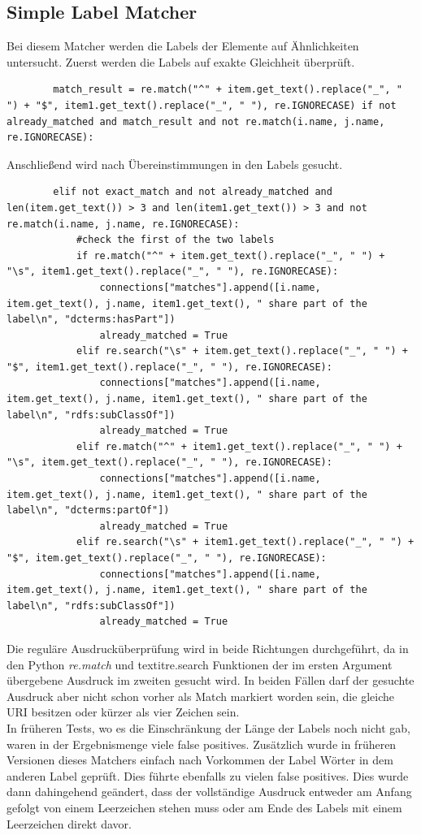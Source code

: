 		\subsection{Simple Label Matcher}
		\label{simpleOntologyMatcher}
		Bei diesem Matcher werden die Labels der Elemente auf Ähnlichkeiten
		untersucht.
		Zuerst werden die Labels auf exakte Gleichheit überprüft.
		\begin{lstlisting}
		match_result = re.match("^" + item.get_text().replace("_", " ") + "$", item1.get_text().replace("_", " "), re.IGNORECASE) if not already_matched and match_result and not re.match(i.name, j.name, re.IGNORECASE):
		\end{lstlisting}
		Anschließend wird nach Übereinstimmungen in den Labels gesucht.
		\begin{lstlisting}
		elif not exact_match and not already_matched and len(item.get_text()) > 3 and len(item1.get_text()) > 3 and not re.match(i.name, j.name, re.IGNORECASE):
            #check the first of the two labels
            if re.match("^" + item.get_text().replace("_", " ") + "\s", item1.get_text().replace("_", " "), re.IGNORECASE):
                connections["matches"].append([i.name, item.get_text(), j.name, item1.get_text(), " share part of the label\n", "dcterms:hasPart"])
                already_matched = True
            elif re.search("\s" + item.get_text().replace("_", " ") + "$", item1.get_text().replace("_", " "), re.IGNORECASE):
                connections["matches"].append([i.name, item.get_text(), j.name, item1.get_text(), " share part of the label\n", "rdfs:subClassOf"])
                already_matched = True
            elif re.match("^" + item1.get_text().replace("_", " ") + "\s", item.get_text().replace("_", " "), re.IGNORECASE):
                connections["matches"].append([i.name, item.get_text(), j.name, item1.get_text(), " share part of the label\n", "dcterms:partOf"])
                already_matched = True
            elif re.search("\s" + item1.get_text().replace("_", " ") + "$", item.get_text().replace("_", " "), re.IGNORECASE):
                connections["matches"].append([i.name, item.get_text(), j.name, item1.get_text(), " share part of the label\n", "rdfs:subClassOf"])
                already_matched = True
		\end{lstlisting}
		Die reguläre Ausdrucküberprüfung wird in beide Richtungen durchgeführt, da in
		den Python \textit{re.match} und textit{re.search} Funktionen der im ersten
		Argument übergebene Ausdruck im zweiten gesucht wird. In beiden Fällen darf
		der gesuchte Ausdruck aber nicht schon vorher als Match markiert worden sein,
		die gleiche URI besitzen oder kürzer als vier Zeichen sein.\\
		In früheren Tests, wo es die Einschränkung der Länge der Labels noch nicht
		gab, waren in der Ergebnismenge viele false positives. Zusätzlich wurde in
		früheren Versionen dieses Matchers einfach nach Vorkommen der Label Wörter in
		dem anderen Label geprüft. Dies führte ebenfalls zu vielen false positives.
		Dies wurde dann dahingehend geändert, dass der vollständige Ausdruck entweder
		am Anfang gefolgt von einem Leerzeichen stehen muss oder am Ende des Labels mit
		einem Leerzeichen direkt davor.
		
